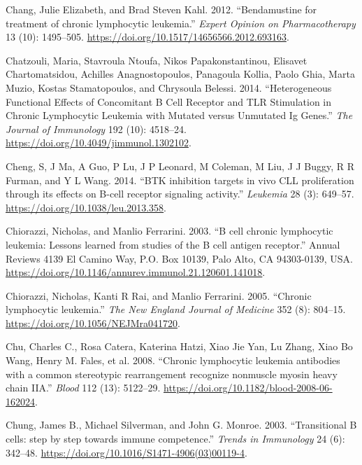 \documentclass[11pt, a4paper, twosided]{book}
\newenvironment{CSLReferences}%
  {}%
  {\par}
\begin{document}
\begin{CSLReferences}{1}{0}
\leavevmode{}%
Chang, Julie Elizabeth, and Brad Steven Kahl. 2012. {``{Bendamustine for treatment of chronic lymphocytic leukemia}.''} \emph{Expert Opinion on Pharmacotherapy} 13 (10): 1495--505. \url{https://doi.org/10.1517/14656566.2012.693163}.

\leavevmode{}%
Chatzouli, Maria, Stavroula Ntoufa, Nikos Papakonstantinou, Elisavet Chartomatsidou, Achilles Anagnostopoulos, Panagoula Kollia, Paolo Ghia, Marta Muzio, Kostas Stamatopoulos, and Chrysoula Belessi. 2014. {``{Heterogeneous Functional Effects of Concomitant B Cell Receptor and TLR Stimulation in Chronic Lymphocytic Leukemia with Mutated versus Unmutated Ig Genes}.''} \emph{The Journal of Immunology} 192 (10): 4518--24. \url{https://doi.org/10.4049/jimmunol.1302102}.

\leavevmode{}%
Cheng, S, J Ma, A Guo, P Lu, J P Leonard, M Coleman, M Liu, J J Buggy, R R Furman, and Y L Wang. 2014. {``{BTK inhibition targets in vivo CLL proliferation through its effects on B-cell receptor signaling activity}.''} \emph{Leukemia} 28 (3): 649--57. \url{https://doi.org/10.1038/leu.2013.358}.

\leavevmode{}%
Chiorazzi, Nicholas, and Manlio Ferrarini. 2003. {``{B cell chronic lymphocytic leukemia: Lessons learned from studies of the B cell antigen receptor}.''} Annual Reviews 4139 El Camino Way, P.O. Box 10139, Palo Alto, CA 94303-0139, USA. \url{https://doi.org/10.1146/annurev.immunol.21.120601.141018}.

\leavevmode{}%
Chiorazzi, Nicholas, Kanti R Rai, and Manlio Ferrarini. 2005. {``{Chronic lymphocytic leukemia.}''} \emph{The New England Journal of Medicine} 352 (8): 804--15. \url{https://doi.org/10.1056/NEJMra041720}.

\leavevmode{}%
Chu, Charles C., Rosa Catera, Katerina Hatzi, Xiao Jie Yan, Lu Zhang, Xiao Bo Wang, Henry M. Fales, et al. 2008. {``{Chronic lymphocytic leukemia antibodies with a common stereotypic rearrangement recognize nonmuscle myosin heavy chain IIA}.''} \emph{Blood} 112 (13): 5122--29. \url{https://doi.org/10.1182/blood-2008-06-162024}.

\leavevmode{}%
Chung, James B., Michael Silverman, and John G. Monroe. 2003. {``{Transitional B cells: step by step towards immune competence}.''} \emph{Trends in Immunology} 24 (6): 342--48. \url{https://doi.org/10.1016/S1471-4906(03)00119-4}.


\end{CSLReferences}
\end{document}
